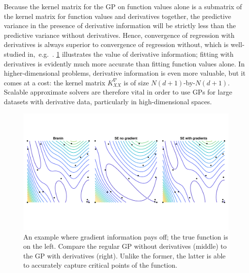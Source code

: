 Because the kernel matrix for the GP on function values alone is a submatrix
of the kernel matrix for function values and derivatives together, the
predictive variance in the presence of derivative information will be strictly
less than the predictive variance without derivatives. Hence, convergence of
regression with derivatives is always superior to convergence of regression
without, which is well\hyp{}studied in,~e.g.~\cite[Chapter 7]{rasmussen06}. 
\cref{fig:branin} illustrates the value of derivative information; fitting with
derivatives is evidently much more accurate than fitting function values alone.
In higher-dimensional problems, derivative information is even more valuable,
but it comes at a cost: the kernel matrix $K^{\nabla}_{XX}$ is of size $N
(d+1)$\hyp{}by\hyp{}$N(d+1)$. Scalable approximate solvers are therefore vital
in order to use GPs for large datasets with derivative data, particularly in
high\hyp{}dimensional spaces.

\begin{figure}[ht]
  \begin{center}
    \includegraphics[width=\textwidth]{./sgpd/pics/branin}
    \caption{An example where gradient information pays off; the true function
    is on the left. Compare the regular GP without derivatives (middle) to the
    GP with derivatives (right). Unlike the former, the latter is able to
    accurately capture critical points of the function.}\label{fig:branin}
  \end{center}
\end{figure}


